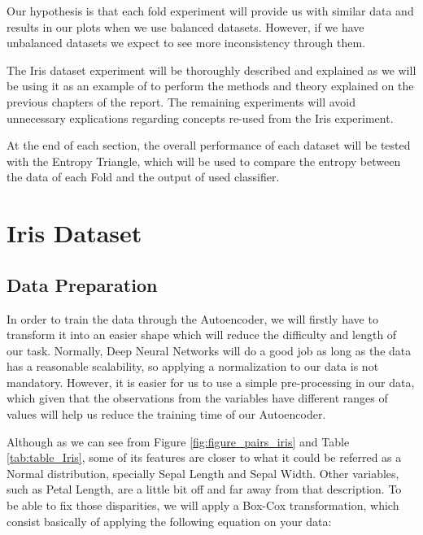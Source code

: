 
Our hypothesis is that each fold experiment will  provide us with similar data and results in our plots when we use balanced datasets. However, if we have unbalanced datasets we expect to see more inconsistency through them.

The Iris dataset experiment will be thoroughly described and explained as we will be using it as an example of to perform the methods and theory explained on the previous chapters of the report. The remaining experiments will avoid unnecessary explications regarding concepts re-used from the Iris experiment.

At the end of each section, the overall performance of each dataset will be tested with the Entropy Triangle, which will be used to compare the entropy between the data of each Fold and the output of used classifier.



\section{Iris Dataset}
\subsection{Data Preparation}

In order to train the data through the Autoencoder, we will firstly have to transform it into an easier shape which will reduce the difficulty and length of our task. Normally, Deep Neural Networks will do a good job as long as the data has a reasonable scalability, so applying a normalization to our data is not mandatory. However, it is easier for us to use a simple pre-processing in our data, which given that the observations from the variables have different ranges of values will help us reduce the training time of our Autoencoder.

Although as we can see from Figure \ref{fig:figure_pairs_iris} and Table \ref{tab:table_Iris}, some of its features are closer to what it could be referred as a Normal distribution, specially Sepal Length and Sepal Width. Other variables, such as Petal Length, are a little bit off and far away from that description. To be able to fix those disparities, we will apply a Box-Cox transformation, which consist basically of applying the following equation on your data:

